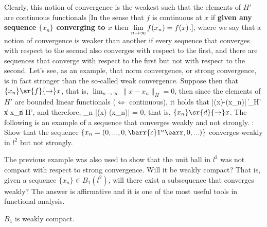 \espa
Clearly, this notion of convergence is the weakest such that the 
elements
of $H'$ are continuous functionals [In the sense that $f$ is
continuous at $x$ if {\bf given any sequence $\{x_n\}$
converging to $x$} then $\displaystyle\lim_{n\to\infty}f(x_n)=f(x)$.], where we say 
that a notion of
convergence is weaker than another if every sequence that
converges with respect to
the second also converges with respect to the first, and there are sequences
that converge with respect to the first but not with respect to the second.
Let's see, as an example, that norm convergence, or strong convergence, is in
fact stronger than the so-called weak convergence.
Suppose then that $\{x_n\} \sr{f}{\rightarrow} x$, that is,
$\lim_{n \to \infty} \|x-x_n\|_H =0$, then since the elements of
$H'$ are bounded linear functionals ($\Longleftrightarrow$ continuous), it holds that 
\beq 
|\sigma(x)-\sigma(x_n)| \leq \|\sigma\|_{H'} \|x-x_n\|\;\;\;\;\;\; \forall \;\;\;\;
\sigma \in H',
\eeq
and therefore, 
\beq
\lim_{n\to\ifi} |\sigma(x)-\sigma(x_n)| = 0,
\eeq 
that is, $\{x_n\} \sr{d}{\rightarrow} 
x$.
The following is an example of a sequence that converges weakly
and not strongly.
\espa
\ejer: 
Show that the sequence $\{x_n = (0,...,0,
\barr{c} \\ 1\\ ^n \earr,0,...)\}$ 
converges
weakly in $l^2$ but not strongly.

The previous example was also used to show that the unit ball 
in $l^2$ was not compact with respect to strong convergence.
Will it be weakly compact? That is, given a sequence 
$\{x_n\} \in B_1(l^2)$, will there exist a subsequence that converges weakly?
The answer is affirmative and it is one of the most useful tools
in functional analysis.

\bteo 
$B_1$ is weakly compact.
\eteo

